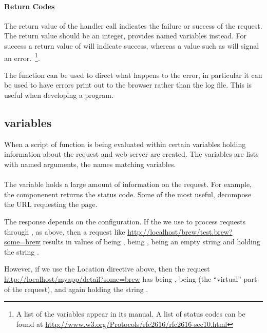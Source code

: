 \paragraph{Return Codes}
The return value of the handler call indicates the failure or success
of the request.  The return value should be an integer, 
provides named variables instead. For success a return value of
 will indicate success, whereas a value such as
 will signal an error.~\footnote{A list of
  the  variables appear in its manual. A list of status
  codes can be found at \url{http://www.w3.org/Protocols/rfc2616/rfc2616-sec10.html}}. 

The function  can be used to direct what
happens to the error, in particular it can be used to have errors
print out to the browser rather than the log file. This is useful when
developing a program.

\subsection{ variables}
\label{sec:pkgrapache-variables}

When a script of function is being evaluated within 
certain variables holding information about the request and web server
are created. The variables are lists with named arguments, the names
matching  variables.

\paragraph{}

The  variable holds a large amount of information on the
request. For example, the  componenent returns the status
code. Some of the most useful, decompose the URL requesting the page.

The response depends on the configuration. If the we use
 to process requests through , as
above, then a request like
\url{http://localhost/brew/test.brew?some=brew} results in values of
 being , 
 being  ,
 being an empty string and 
 holding the string .

However, if we use the Location directive above, then the request
\url{http://localhost/myapp/detail?some=brew} has  being
,  being  (the
``virtual'' part of the request), and  again holding the
string .



